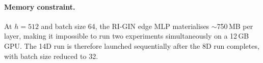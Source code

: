 \paragraph{Memory constraint.}
At $h = 512$ and batch size 64, the RI-GIN edge MLP materialises $\sim$750\,MB
per layer, making it impossible to run two experiments simultaneously on a
12\,GB GPU.
The 14D run is therefore launched sequentially after the 8D run completes,
with batch size reduced to 32.
